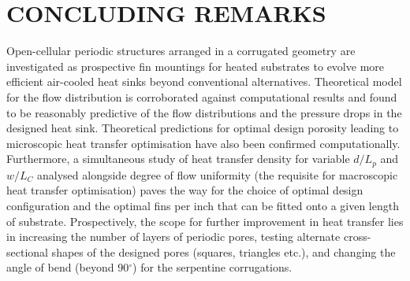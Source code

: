 \documentclass[twocolumn,10pt,cleanfoot]{ihmtc}
\begin{document}
\section{CONCLUDING REMARKS}
Open-cellular periodic structures arranged in a corrugated geometry are investigated as prospective fin mountings for heated substrates to evolve more efficient air-cooled heat sinks beyond conventional alternatives. Theoretical model for the flow distribution is corroborated against computational results and found to be reasonably predictive of the flow distributions and  the pressure drops in the designed heat sink. Theoretical predictions for optimal design porosity leading to microscopic heat transfer optimisation have also been confirmed computationally. Furthermore, a simultaneous study of heat transfer density for variable $d/L_p$ and $w/L_C$ analysed alongside degree of flow uniformity (the requisite for macroscopic heat transfer optimisation) paves the way for the choice of optimal design configuration and the optimal fins per inch that can be fitted onto a given length of substrate. Prospectively, the scope for further improvement in heat transfer lies in increasing the number of layers of periodic pores, testing alternate cross-sectional shapes of the designed pores (squares, triangles etc.), and changing the angle of bend (beyond 90$^\circ$) for the serpentine corrugations.



\end{document}
